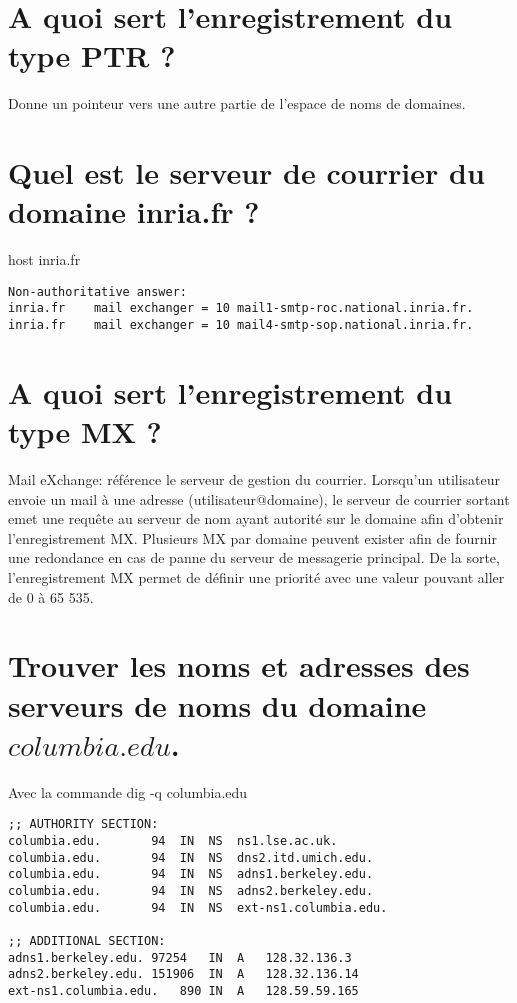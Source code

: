 \section{A quoi sert l'enregistrement du type PTR ?}
Donne un pointeur vers une autre partie de l'espace de noms de domaines. 
\section{Quel est le serveur de courrier du domaine inria.fr ?}
host inria.fr
\begin{verbatim}
Non-authoritative answer: 
inria.fr	mail exchanger = 10 mail1-smtp-roc.national.inria.fr. 
inria.fr	mail exchanger = 10 mail4-smtp-sop.national.inria.fr.
\end{verbatim}


\section{A quoi sert l'enregistrement du type MX ?}
Mail eXchange: référence le serveur de gestion du courrier. Lorsqu'un utilisateur envoie un mail à une adresse (utilisateur@domaine), le serveur de courrier sortant emet une requête au serveur de nom ayant autorité sur le domaine afin d'obtenir l'enregistrement MX. Plusieurs MX par domaine peuvent exister afin de fournir une redondance en cas de panne du serveur de messagerie principal. De la sorte, l'enregistrement MX permet de définir une priorité avec une valeur pouvant aller de 0 à 65 535.
\section{Trouver les noms et adresses des serveurs de noms du domaine $columbia.edu$.}
Avec la commande dig -q columbia.edu \newline
\begin{verbatim}
;; AUTHORITY SECTION:
columbia.edu.		94	IN	NS	ns1.lse.ac.uk.
columbia.edu.		94	IN	NS	dns2.itd.umich.edu.
columbia.edu.		94	IN	NS	adns1.berkeley.edu.
columbia.edu.		94	IN	NS	adns2.berkeley.edu.
columbia.edu.		94	IN	NS	ext-ns1.columbia.edu.

;; ADDITIONAL SECTION:
adns1.berkeley.edu.	97254	IN	A	128.32.136.3
adns2.berkeley.edu.	151906	IN	A	128.32.136.14
ext-ns1.columbia.edu.	890	IN	A	128.59.59.165
\end{verbatim}

